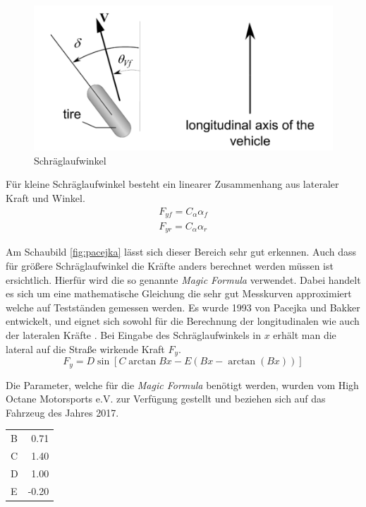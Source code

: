 \documentclass{like}
\begin{document}
\begin{figure}[ht!]
	\includegraphics[width=400pt]{Abbildungen/linLat.png}
	\caption{Schräglaufwinkel}
	\label{fig:linLat}
\end{figure}




Für kleine Schräglaufwinkel besteht ein linearer Zusammenhang aus lateraler Kraft und Winkel. 
\begin{eqnarray}
F_{yf} = C_\alpha \alpha_f \\
F_{yr} = C_\alpha \alpha_r
\end{eqnarray}

Am Schaubild \ref{fig:pacejka} lässt sich dieser Bereich sehr gut erkennen.
Auch dass für größere Schräglaufwinkel die Kräfte anders berechnet werden müssen ist ersichtlich. Hierfür wird die so genannte \textit{Magic Formula}  \cite{magicFormula} verwendet. Dabei handelt es sich um eine mathematische Gleichung die sehr gut Messkurven approximiert welche auf Testständen gemessen werden.
Es wurde 1993 von Pacejka und Bakker entwickelt, und eignet sich sowohl für die Berechnung der longitudinalen wie auch der lateralen Kräfte . Bei Eingabe des Schräglaufwinkels in \(x\) erhält man die lateral auf die Straße wirkende Kraft \(F_y\). 
 \begin{equation}
 F_y = D\sin[C\arctan{Bx - E(Bx - \arctan(Bx))}]
 \label{eq:magicF}
 \end{equation}
 
Die Parameter, welche für die \textit{Magic Formula} benötigt werden, wurden vom High Octane Motorsports e.V. zur Verfügung gestellt und beziehen sich auf das Fahrzeug des Jahres 2017.
 
\begin{tabular}[t]{lr}
 	B	&	0.71 \\
 	C	&	1.40 \\
 	D	&	1.00 \\
 	E	&  -0.20 \\
\end{tabular}
 
\end{document}
